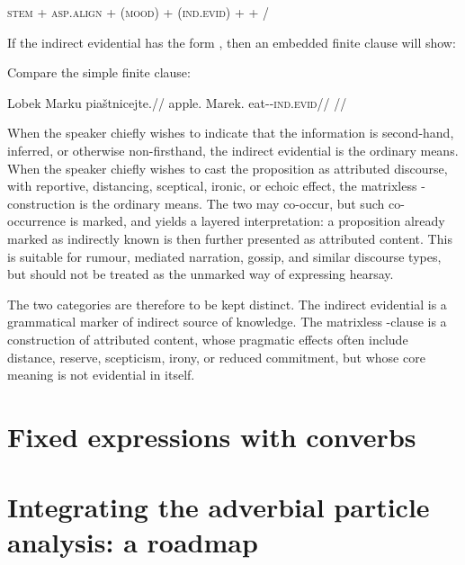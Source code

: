 \begin{center}
\textsc{stem} + \textsc{asp.align} + (\textsc{mood}) + (\textsc{ind.evid}) +  + /
\end{center}

If the indirect evidential has the form , then an embedded finite
clause will show:

\begin{center}
\end{center}

Compare the simple finite clause:

\ex
\begingl
\gla Lobek Marku piaštnicejte.//
\glb apple.\Dir{} Marek.\Trs{} eat-\Pf{}-\textsc{ind.evid}//
\glft {}//
\endgl
\xe

When the speaker chiefly wishes to indicate that the information is
second-hand, inferred, or otherwise non-firsthand, the indirect evidential is
the ordinary means. When the speaker chiefly wishes to cast the proposition
as attributed discourse, with reportive, distancing, sceptical, ironic, or
echoic effect, the matrixless -construction is the ordinary means.
The two may co-occur, but such co-occurrence is marked, and yields a layered
interpretation: a proposition already marked as indirectly known is then
further presented as attributed content. This is suitable for rumour,
mediated narration, gossip, and similar discourse types, but should not be
treated as the unmarked way of expressing hearsay.

The two categories are therefore to be kept distinct. The indirect
evidential is a grammatical marker of indirect source of knowledge. The
matrixless -clause is a construction of attributed content, whose
pragmatic effects often include distance, reserve, scepticism, irony, or
reduced commitment, but whose core meaning is not evidential in itself.

\section{Fixed expressions with converbs}\label{sec:fixed-converbs}


\section{Integrating the adverbial particle analysis: a roadmap}
\label{sec:th-particle-integration}

